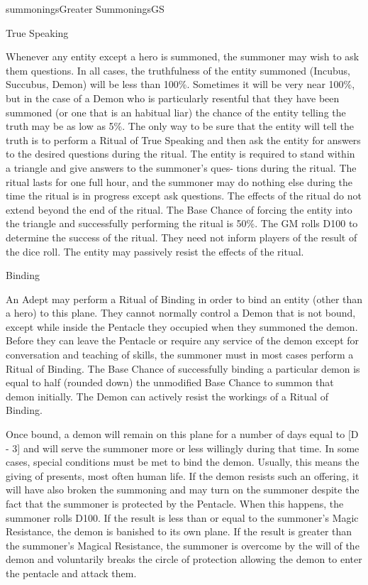\begin{College}[1.0]{summonings}{Greater Summonings}{GS}
\begin{ritual}[Q-5]{True Speaking}
\begin{effects}
Whenever any entity except a hero is summoned, the summoner may wish
to ask them questions.  In all cases, the truthfulness of the entity
summoned (Incubus, Succubus, Demon) will be less than 100\%.
Sometimes it will be very near 100\%, but in the case of a Demon who
is particularly resentful that they have been summoned (or one that is
an habitual liar) the chance of the entity telling the truth may be as
low as 5\%.  The only way to be sure that the entity will tell the
truth is to perform a Ritual of True Speaking and then ask the entity
for answers to the desired questions during the ritual.  The entity is
required to stand within a triangle and give answers to the summoner’s
ques- tions during the ritual.  The ritual lasts for one full hour,
and the summoner may do nothing else during the time the ritual is in
progress except ask questions.  The effects of the ritual do not
extend beyond the end of the ritual.  The Base Chance of forcing the
entity into the triangle and successfully performing the ritual is
50\%.  The GM rolls D100 to determine the success of the ritual.  They
need not inform players of the result of the dice roll. The entity may
passively resist the effects of the ritual.
\end{effects}
\end{ritual}

\begin{ritual}[Q-6]{Binding}

\begin{effects}
An Adept may perform a Ritual of Binding in order to bind an entity
(other than a hero) to this plane. They cannot normally control a
Demon that is not bound, except while inside the Pentacle they
occupied when they summoned the demon. Before they can leave the
Pentacle or require any service of the demon except for conversation
and teaching of skills, the summoner must in most cases perform a
Ritual of Binding.  The Base Chance of successfully binding a
particular demon is equal to half (rounded down) the unmodified Base
Chance to summon that demon initially.  The Demon can actively resist
the workings of a Ritual of Binding.

Once bound, a demon will remain on this plane for a number of days
equal to [D - 3] and will serve the summoner more or less willingly
during that time.  In some cases, special conditions must be met to
bind the demon.  Usually, this means the giving of presents, most
often human life.  If the demon resists such an offering, it will have
also broken the summoning and may turn on the summoner despite the
fact that the summoner is protected by the Pentacle.  When this
happens, the summoner rolls D100. If the result is less than or equal
to the summoner’s Magic Resistance, the demon is banished to its own
plane.  If the result is greater than the summoner’s Magical
Resistance, the summoner is overcome by the will of the demon and
voluntarily breaks the circle of protection allowing the demon to
enter the pentacle and attack them.


\end{effects}
\end{ritual}
\end{College}
